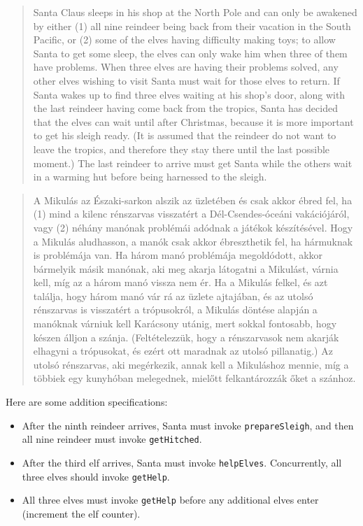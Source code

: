 \documentclass{book}
\begin{document}
\begin{quotation}
Santa Claus sleeps in his shop at the North Pole and can only be
awakened by either (1) all nine reindeer being back from their
vacation in the South Pacific, or (2) some of the elves having
difficulty making toys; to allow Santa to get some sleep, the elves
can only wake him when three of them have problems.  When three elves
are having their problems solved, any other elves wishing to visit
Santa must wait for those elves to return.  If Santa wakes up to find
three elves waiting at his shop's door, along with the last reindeer
having come back from the tropics, Santa has decided that the elves can
wait until after Christmas, because it is more important to get his
sleigh ready.  (It is assumed that the reindeer do not want to leave
the tropics, and therefore they stay there until the last possible
moment.)  The last reindeer to arrive must get Santa while the others
wait in a warming hut before being harnessed to the sleigh.
\end{quotation}

\begin{quotation}
A Mikulás az Északi-sarkon alszik az üzletében és csak akkor ébred fel,
ha (1) mind a kilenc rénszarvas visszatért a Dél-Csendes-óceáni vakációjáról,
vagy (2) néhány manónak problémái adódnak a játékok készítésével. Hogy a Mikulás
aludhasson, a manók csak akkor ébreszthetik fel, ha hármuknak is problémája van.
Ha három manó problémája megoldódott, akkor bármelyik másik manónak, aki meg
akarja látogatni a Mikulást, várnia kell, míg az a három manó vissza nem ér.
Ha a Mikulás felkel, és azt találja, hogy három manó vár rá az üzlete ajtajában,
és az utolsó rénszarvas is visszatért a trópusokról, a Mikulás döntése alapján a
manóknak várniuk kell Karácsony utánig, mert sokkal fontosabb, hogy készen
álljon a szánja. (Feltételezzük, hogy a rénszarvasok nem akarják elhagyni a
trópusokat, és ezért ott maradnak az utolsó pillanatig.) Az utolsó rénszarvas,
aki megérkezik, annak kell a Mikuláshoz mennie, míg a többiek egy kunyhóban
melegednek, mielőtt felkantározzák őket a szánhoz.
\end{quotation}


Here are some addition specifications:

\begin {itemize}

\item After the ninth reindeer arrives, Santa must invoke 
{\tt prepareSleigh}, and then all nine reindeer must
invoke {\tt getHitched}.

\item After the third elf arrives, Santa must invoke {\tt helpElves}.
Concurrently, all three elves should invoke {\tt getHelp}.

\item All three elves must invoke {\tt getHelp} before any additional
elves enter (increment the elf counter).

\end {itemize}
\end{document}
